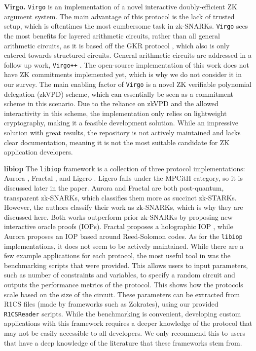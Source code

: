 \textbf{Virgo.}
\texttt{Virgo} \cite{zhang2020transparent} is an implementation of a novel interactive doubly-efficient ZK argument system. The main advantage of this protocol is the lack of trusted setup, which is oftentimes the most cumbersome task in zk-SNARKs. \texttt{Virgo} sees the most benefits for layered arithmetic circuits, rather than all general arithmetic circuits, as it is based off the GKR protocol \cite{goldwasser2015delegating}, which also is only catered towards structured circuits. General arithmetic circuits are addressed in a follow up work, \texttt{Virgo++} \cite{virgoplus}. The open-source implementation of this work does not have ZK commitments implemented yet, which is why we do not consider it in our survey. The main enabling factor of \texttt{Virgo} is a novel ZK verifiable polynomial delegation (zkVPD) scheme, which can essentially be seen as a commitment scheme in this scenario. 
Due to the reliance on zkVPD and the allowed interactivity in this scheme, the implementation only relies on lightweight cryptography, making it a feasible development solution. While an impressive solution with great results, the repository is not actively maintained and lacks clear documentation, meaning it is not the most suitable candidate for ZK application developers.

\textbf{libiop} \label{sec:aurora}
The \texttt{libiop} framework \cite{SciprLab2023Libiop} is a collection of three protocol implementations: Aurora \cite{aurora}, Fractal \cite{fractal}, and Ligero \cite{ames2017ligero}. Ligero falls under the MPCitH category, so it is discussed later in the paper. Aurora and Fractal are both post-quantum, transparent zk-SNARKs, which classifies them more as succinct zk-STARKs. However, the authors classify their work as zk-SNARKs, which is why they are discussed here. Both works outperform prior zk-SNARKs by proposing new interactive oracle proofs (IOPs). Fractal proposes a holographic IOP \cite{babai1993transparent}, while Aurora proposes an IOP based around Reed-Solomon codes.
As for the \texttt{libiop} implementations, it does not seem to be actively maintained. While there are a few example applications for each protocol, the most useful tool in was the benchmarking scripts that were provided. This allows users to input parameters, such as number of constraints and variables, to specify a random circuit and outputs the performance metrics of the protocol. This shows how the protocols scale based on the size of the circuit. These parameters can be extracted from R1CS files (made by frameworks such as Zokrates), using our provided \texttt{R1CSReader} scripts. While the benchmarking is convenient, developing custom applications with this framework requires a deeper knowledge of the protocol that may not be easily accessible to all developers. We only recommend this to users that have a deep knowledge of the literature that these frameworks stem from.



